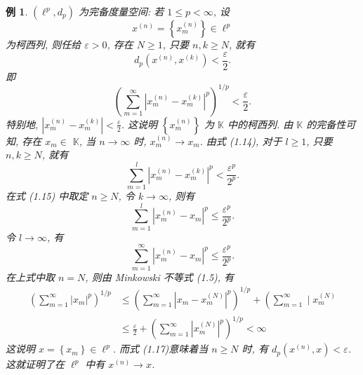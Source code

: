 \documentclass[openany]{ctexbook}
\theoremstyle{kaiti}
\theoremstyle{normal}
\newtheorem{example}{例}[section]
\begin{document}
\begin{example}
$\left(\ell^{p}, d_{p}\right)$ 为完备度量空间: 若 $1 \leqslant p<\infty$, 设
$$
x^{(n)}=\left\{x_m^{(n)}\right\} \in \ell^{p}
$$
为柯西列, 则任给 $\varepsilon>0$, 存在 $N \geqslant 1$, 只要 $n, k \geqslant N$, 就有
$$
d_{p}\left(x^{(n)}, x^{(k)}\right)<\frac{\varepsilon}{2}.
$$
即
\begin{equation}
  \left(\sum_{m=1}^{\infty}\left|x_m^{(n)}-x_m^{(k)}\right|^{p}\right)^{1 / p}<\frac{\varepsilon}{2}.
\end{equation}
特别地, $\left|x_m^{(n)}-x_m^{(k)}\right|<\frac{\varepsilon}{2}$. 这说明 $\left\{x_m^{(n)}\right\}$ 为 $\mathbb{K}$ 中的柯西列. 由 $\mathbb{K}$ 的完备性可知, 存在 $x_m \in$ $\mathbb{K}$, 当 $n \rightarrow \infty$ 时, $x_m^{(n)} \rightarrow x_m$. 由式 (1.14), 对于 $l \geqslant 1$, 只要 $n, k \geqslant N$, 就有
\begin{equation}
  \sum_{m=1}^{l}\left|x_m^{(n)}-x_m^{(k)}\right|^{p}<\frac{\varepsilon^{p}}{2^{p}}.
\end{equation}
在式 (1.15) 中取定 $n \geqslant N$, 令 $k \rightarrow \infty$, 则有
\begin{equation}
  \sum_{m=1}^{l}\left|x_m^{(n)}-x_m\right|^{p} \leqslant \frac{\varepsilon^{p}}{2^{p}}.
\end{equation}
令 $l\rightarrow\infty$, 有
\begin{equation}
  \sum_{m=1}^{\infty}\left|x_m^{(n)}-x_m\right|^{p} \leqslant \frac{\varepsilon^{p}}{2^{p}}.
\end{equation}
在上式中取 $n=N$, 则由 Minkowski 不等式 (1.5), 有
$$
\begin{aligned}
\left(\sum_{m=1}^{\infty}\left|x_m\right|^{p}\right)^{1 / p} & \leqslant\left(\sum_{m=1}^{\infty}\left|x_m-x_m^{(N)}\right|^{p}\right)^{1 / p}+\left(\sum_{m=1}^{\infty} \mid x_m^{(N)}\right.\\
& \leqslant \frac{\varepsilon}{2}+\left(\sum_{m=1}^{\infty}\left|x_m^{(N)}\right|^{p}\right)^{1 / p}<\infty
\end{aligned}
$$
这说明 $x=\left\{x_m\right\} \in \ell^{p}$. 而式 (1.17)意味着当 $n \geqslant N$ 时, 有 $d_{p}\left(x^{(n)}, x\right)<\varepsilon$. 这就证明了在 $\ell^{p}$ 中有 $x^{(n)} \rightarrow x$.
\end{example}
\end{document}

